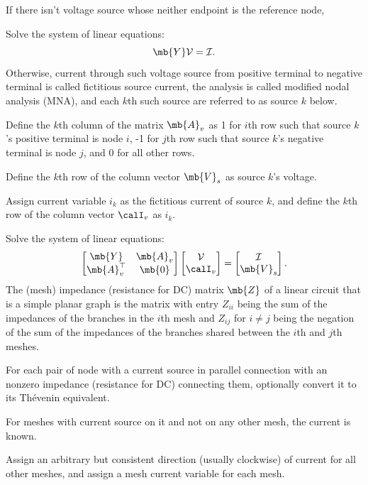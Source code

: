 \documentclass[a4paper,12pt]{article}
\begin{document}
\item If there isn't voltage source whose neither endpoint is the reference node,
\ben
\item Solve the system of linear equations:
\[\mb{Y}\mathcal{V}=\mathcal{I}.\]
\een
Otherwise, current through such voltage source from positive terminal to negative terminal is called fictitious source current, the analysis is called modified nodal analysis (MNA), and each $k$th such source are referred to as source $k$ below.
\ben
\item Define the $k$th column of the matrix $\mb{A}_v$ as 1 for $i$th row such that source $k$'s positive terminal is node $i$, -1 for $j$th row such that source $k$'s negative terminal is node $j$, and 0 for all other rows.
\item Define the $k$th row of the column vector $\mb{V}_s$ as source $k$'s voltage.
\item Assign current variable $i_k$ as the fictitious current of source $k$, and define the $k$th row of the column vector $\calI_v$ as $i_k$.
\item Solve the system of linear equations:
\[\begin{bmatrix}\mb{Y}&\mb{A}_v\\\mb{A}_v^{\top}&\mb{0}\end{bmatrix}\begin{bmatrix}\mathcal{V}\\\calI_v\end{bmatrix}=\begin{bmatrix}\mathcal{I}\\\mb{V}_s\end{bmatrix}.\]
\een
\een
{}
The (mesh) impedance (resistance for DC) matrix $\mb{Z}$ of a linear circuit that is a simple planar graph is the matrix with entry $Z_{ii}$ being the sum of the impedances of the branches in the $i$th mesh and $Z_{ij}$ for $i\neq j$ being the negation of the sum of the impedances of the branches shared between the $i$th and $j$th meshes.
\ben
\item For each pair of node with a current source in parallel connection with an nonzero impedance (resistance for DC) connecting them, optionally convert it to its Thévenin equivalent.
\item For meshes with current source on it and not on any other mesh, the current is known.
\item Assign an arbitrary but consistent direction (usually clockwise) of current for all other meshes, and assign a mesh current variable for each mesh.
\end{document}
